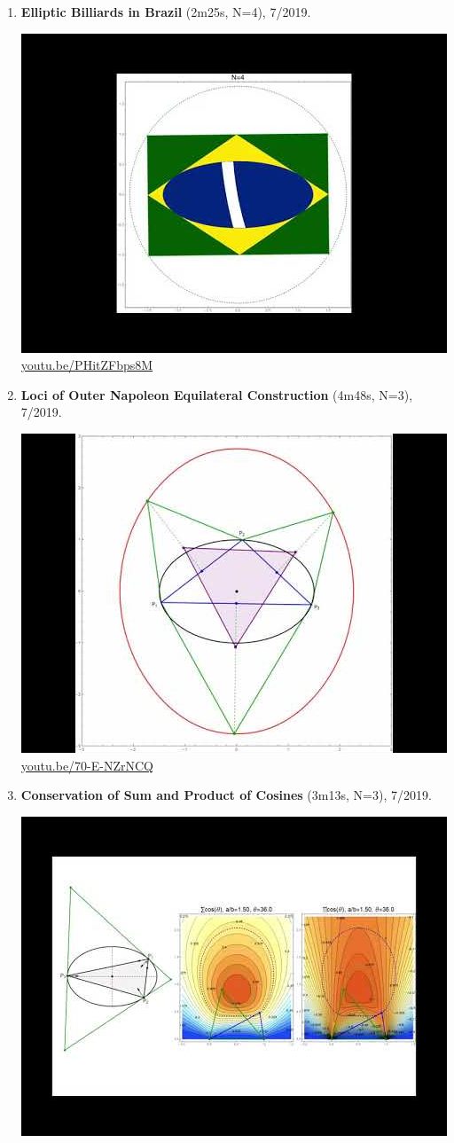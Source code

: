 \documentclass[12pt]{amsart}
\begin{document}
\begin{enumerate}[resume]
\item \textbf{Elliptic Billiards in Brazil} (2m25s, N=4), 7/2019. 
\begin{center}\includegraphics[width=.5\textwidth]{pics/PHitZFbps8M.jpg} \\ 
\href{https://youtu.be/PHitZFbps8M}{\url{youtu.be/PHitZFbps8M}}\end{center}
% 
\item \textbf{Loci of Outer Napoleon Equilateral Construction} (4m48s, N=3), 7/2019. 
\begin{center}\includegraphics[width=.5\textwidth]{pics/70-E-NZrNCQ.jpg} \\ 
\href{https://youtu.be/70-E-NZrNCQ}{\url{youtu.be/70-E-NZrNCQ}}\end{center}
% 
\item \textbf{Conservation of Sum and Product of Cosines} (3m13s, N=3), 7/2019. 
\begin{center}\includegraphics[width=.5\textwidth]{pics/P8ykpE_ZbZ8.jpg} \\ 

\end{center}
\end{enumerate}
\end{document}
